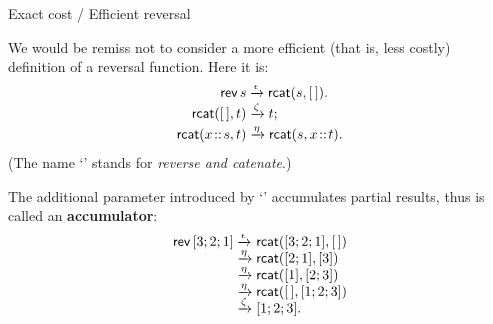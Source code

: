 %
\begin{frame}{Exact cost / Efficient reversal}

  We would be remiss not to consider a more efficient (that is, less
  costly) definition of a reversal function. Here it is:
  \begin{align*}
    \textsf{rev}\,s &\xrightarrow{\smash{\epsilon}} \textsf{rcat}(s,[\,]).\\
    \textsf{rcat}([\,],t) & \xrightarrow{\smash{\zeta}} t;\\
    \textsf{rcat}({x}\!::\!{s},t) &\xrightarrow{\smash{\eta}}
    \textsf{rcat}(s,{x}\!::\!{t}).
  \end{align*}
  (The name `' stands for \emph{reverse and catenate}.)

  \bigskip

  The additional parameter introduced by `' accumulates
  partial results, thus is called an \textbf{accumulator}:
  \begin{equation*}
    \begin{array}{r@{\;}l@{\;}l}
      \fun{rev}\,[3;2;1]
      & \smashedrightarrow{\epsilon} & \fun{rcat}([3;2;1],\el)\\
      & \smashedrightarrow{\eta}     & \fun{rcat}([2;1],[3])\\
      & \smashedrightarrow{\eta}     & \fun{rcat}([1],[2;3])\\
      & \smashedrightarrow{\eta}     & \fun{rcat}(\el,[1;2;3])\\
      & \smashedrightarrow{\zeta}    & [1;2;3].
    \end{array}
  \end{equation*}

\end{frame}

